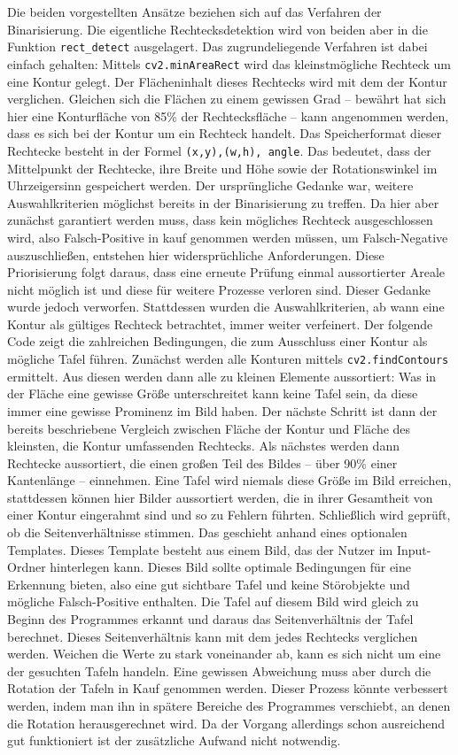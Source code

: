 Die beiden vorgestellten Ansätze beziehen sich auf das Verfahren der Binarisierung. Die eigentliche Rechtecksdetektion wird von beiden aber in die Funktion \verb|rect_detect| ausgelagert. Das zugrundeliegende Verfahren ist dabei einfach gehalten: Mittels \verb|cv2.minAreaRect| wird das kleinstmögliche Rechteck um eine Kontur gelegt. Der Flächeninhalt dieses Rechtecks wird mit dem der Kontur verglichen. Gleichen sich die Flächen zu einem gewissen Grad -- bewährt hat sich hier eine Konturfläche von 85\% der Rechtecksfläche -- kann angenommen werden, dass es sich bei der Kontur um ein Rechteck handelt. Das Speicherformat dieser Rechtecke besteht in der Formel \verb|(x,y),(w,h), angle|. Das bedeutet, dass der Mittelpunkt der Rechtecke, ihre Breite und Höhe sowie der Rotationswinkel im Uhrzeigersinn gespeichert werden. 
Der ursprüngliche Gedanke war, weitere Auswahlkriterien möglichst bereits in der Binarisierung zu treffen. Da hier aber zunächst garantiert werden muss, dass kein mögliches Rechteck ausgeschlossen wird, also Falsch-Positive in kauf genommen werden müssen, um Falsch-Negative auszuschließen, entstehen hier widersprüchliche Anforderungen. Diese Priorisierung folgt daraus, dass eine erneute Prüfung einmal aussortierter Areale nicht möglich ist und diese für weitere Prozesse verloren sind.
Dieser Gedanke wurde jedoch verworfen. Stattdessen wurden die Auswahlkriterien, ab wann eine Kontur als gültiges Rechteck betrachtet, immer weiter verfeinert. Der folgende Code zeigt die zahlreichen Bedingungen, die zum Ausschluss einer Kontur als mögliche Tafel führen.
Zunächst werden alle Konturen mittels \verb|cv2.findContours| ermittelt. Aus diesen werden dann alle zu kleinen Elemente aussortiert: Was in der Fläche eine gewisse Größe unterschreitet kann keine Tafel sein, da diese immer eine gewisse Prominenz im Bild haben. Der nächste Schritt ist dann der bereits beschriebene Vergleich zwischen Fläche der Kontur und Fläche des kleinsten, die Kontur umfassenden Rechtecks. Als nächstes werden dann Rechtecke aussortiert, die einen großen Teil des Bildes -- über 90\% einer Kantenlänge -- einnehmen. Eine Tafel wird niemals diese Größe im Bild erreichen, stattdessen können hier Bilder aussortiert werden, die in ihrer Gesamtheit von einer Kontur eingerahmt sind und so zu Fehlern führten. Schließlich wird geprüft, ob die Seitenverhältnisse stimmen. Das geschieht anhand eines optionalen Templates. Dieses Template besteht aus einem Bild, das der Nutzer im Input-Ordner hinterlegen kann. Dieses Bild sollte optimale Bedingungen für eine Erkennung bieten, also eine gut sichtbare Tafel und keine Störobjekte und mögliche Falsch-Positive enthalten. Die Tafel auf diesem Bild wird gleich zu Beginn des Programmes erkannt und daraus das Seitenverhältnis der Tafel berechnet. Dieses Seitenverhältnis kann mit dem jedes Rechtecks verglichen werden. Weichen die Werte zu stark voneinander ab, kann es sich nicht um eine der gesuchten Tafeln handeln. Eine gewissen Abweichung muss aber durch die Rotation der Tafeln in Kauf genommen werden. Dieser Prozess könnte verbessert werden, indem man ihn in spätere Bereiche des Programmes verschiebt, an denen die Rotation herausgerechnet wird. Da der Vorgang allerdings schon ausreichend gut funktioniert ist der zusätzliche Aufwand nicht notwendig.

